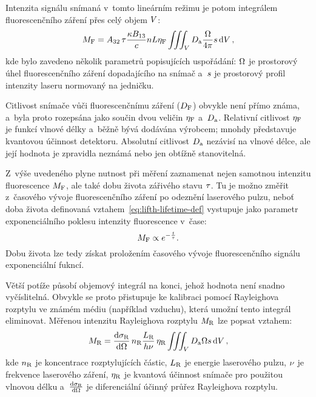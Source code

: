 Intenzita signálu snímaná v~tomto lineárním režimu je potom
integrálem fluorescenčního záření přes celý objem $V$:
\begin{equation}
	\label{eq:lifth-lifsignal}
	M_\text{F} = A_{32}\,\tau
	\frac{\kappa B_{13}}{c}
	n L \eta_\text{F}
	\iiint_V D_\text{a} \frac{\Omega}{4\pi} s \dd{V},
\end{equation}
kde bylo zavedeno několik parametrů popisujících uspořádání:
$\Omega$ je prostorový úhel fluorescenčního záření dopadajícího
na snímač
a~$s$ je prostorový profil intenzity laseru normovaný na jedničku.

Citlivost snímače vůči fluorescenčnímu záření ($D_\text{F}$) obvykle není přímo
známa,
a~byla proto rozepsána jako součin dvou veličin $\eta_\text{F}$ a~$D_\text{a}$.
Relativní citlivost $\eta_\text{F}$ je funkcí vlnové délky a~běžně bývá dodávána
výrobcem; mnohdy představuje kvantovou účinnost detektoru.
Absolutní citlivost $D_\text{a}$ nezávisí na vlnové délce,
ale její hodnota je zpravidla neznámá nebo jen obtížně stanovitelná.

Z~výše uvedeného plyne nutnost při měření zaznamenat nejen samotnou
intenzitu fluorescence $M_\text{F}$,
ale také dobu života zářivého stavu $\tau$.
Tu je možno změřit z~časového vývoje fluorescenčního záření po odeznění
laserového pulzu,
neboť doba života definovaná vztahem~\eqref{eq:lifth-lifetime-def} vystupuje
jako parametr exponenciálního poklesu intenzity fluorescence v~čase:
\begin{equation}
	M_\text{F} \propto e^{-\frac{t}{\tau}}.
\end{equation}
Dobu života lze tedy získat proložením časového vývoje fluorescenčního
signálu exponenciální fukncí.

Větší potíže působí objemový integrál na konci, jehož hodnota není snadno
vyčíslitelná.
Obvykle se proto přistupuje ke kalibraci pomocí Ray\-leigh\-ova rozptylu
ve známém médiu (například vzduchu),
která umožní tento integrál eliminovat.
Měřenou intenzitu Rayleighova rozptylu $M_\text{R}$ lze popsat vztahem:%
\autocite{lif-oh}
\begin{equation}
	\label{eq:lifth-rayleighsignal}
	M_\text{R} = \dv{\sigma_\text{R}}{\Omega} \, n_\text{R}
	\frac{L_\text{R}}{h\nu} \, \eta_\text{R}
	\iiint_V D_\text{a} \Omega s \dd{V},
\end{equation}
kde $n_\text{R}$ je koncentrace rozptylujících částic,
$L_\text{R}$ je energie laserového pulzu,
$\nu$ je frekvence laserového záření,
$\eta_\text{R}$ je kvantová účinnost snímače pro použitou vlnovou délku
a~$\dv{\sigma_\text{R}}{\Omega}$ je diferenciální účinný průřez Rayleighova rozptylu.

